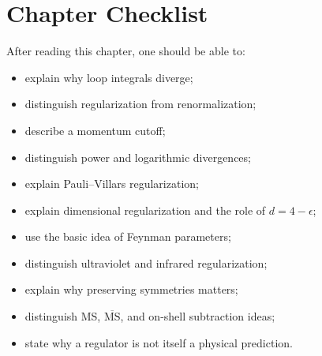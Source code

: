 \section{Chapter Checklist}

After reading this chapter, one should be able to:
\begin{itemize}
    \item explain why loop integrals diverge;
    \item distinguish regularization from renormalization;
    \item describe a momentum cutoff;
    \item distinguish power and logarithmic divergences;
    \item explain Pauli--Villars regularization;
    \item explain dimensional regularization and the role of \(d=4-\epsilon\);
    \item use the basic idea of Feynman parameters;
    \item distinguish ultraviolet and infrared regularization;
    \item explain why preserving symmetries matters;
    \item distinguish MS, \(\overline{\mathrm{MS}}\), and on-shell subtraction
    ideas;
    \item state why a regulator is not itself a physical prediction.
\end{itemize}
